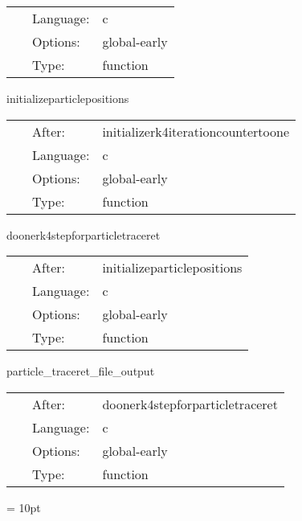  \begin{tabular*}{160mm}{cll} 
~ & Language:  & c \\ 
~ & Options:  & global-early \\ 
~ & Type:  & function \\ 
\end{tabular*} 


\vspace{5mm}


\hspace{5mm} initializeparticlepositions 

\hspace{5mm}{\it initialize particle positions } 


\hspace{5mm}

 \begin{tabular*}{160mm}{cll} 
~ & After:  & initializerk4iterationcountertoone \\ 
~ & Language:  & c \\ 
~ & Options:  & global-early \\ 
~ & Type:  & function \\ 
\end{tabular*} 


\vspace{5mm}


\hspace{5mm} doonerk4stepforparticletraceret 

\hspace{5mm}{\it do one rk4 step for particle traceret } 


\hspace{5mm}

 \begin{tabular*}{160mm}{cll} 
~ & After:  & initializeparticlepositions \\ 
~ & Language:  & c \\ 
~ & Options:  & global-early \\ 
~ & Type:  & function \\ 
\end{tabular*} 


\vspace{5mm}


\hspace{5mm} particle\_traceret\_file\_output 

\hspace{5mm}{\it output particle traceret data to disk } 


\hspace{5mm}

 \begin{tabular*}{160mm}{cll} 
~ & After:  & doonerk4stepforparticletraceret \\ 
~ & Language:  & c \\ 
~ & Options:  & global-early \\ 
~ & Type:  & function \\ 
\end{tabular*} 



\vspace{5mm}\parskip = 10pt 
